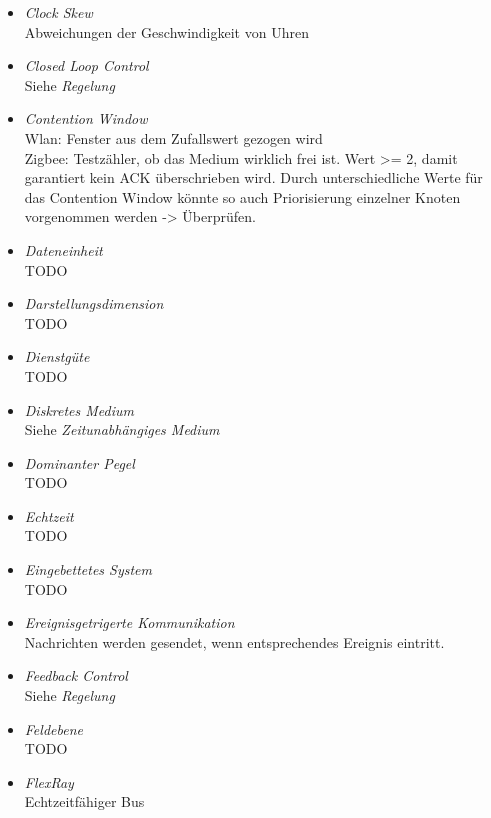 \documentclass{article}
\begin{document}
\begin{itemize}
	\item \emph{Clock Skew}\\
		Abweichungen der Geschwindigkeit von Uhren

	\item \emph{Closed Loop Control}\\
		Siehe \emph{Regelung}

	\item \emph{Contention Window}\\
		Wlan: Fenster aus dem Zufallswert gezogen wird\\
		Zigbee: Testzähler, ob das Medium wirklich frei ist. Wert >= 2, damit garantiert kein ACK überschrieben wird. Durch unterschiedliche Werte für das Contention Window könnte so auch Priorisierung einzelner Knoten vorgenommen werden -> Überprüfen.

	\item \emph{Dateneinheit}\\
		TODO
	
	\item \emph{Darstellungsdimension}\\
		TODO

	\item \emph{Dienstgüte}\\
		TODO

	\item \emph{Diskretes Medium}\\
		Siehe \emph{Zeitunabhängiges Medium}

	\item \emph{Dominanter Pegel}\\
		TODO

	\item \emph{Echtzeit}\\
		TODO

	\item \emph{Eingebettetes System}\\
		TODO

	\item \emph{Ereignisgetrigerte Kommunikation}\\
		Nachrichten werden gesendet, wenn entsprechendes Ereignis eintritt.

	\item \emph{Feedback Control}\\
		Siehe \emph{Regelung}

	\item \emph{Feldebene}\\
		TODO

	\item \emph{FlexRay}\\
		Echtzeitfähiger Bus


\end{itemize}
\end{document}
